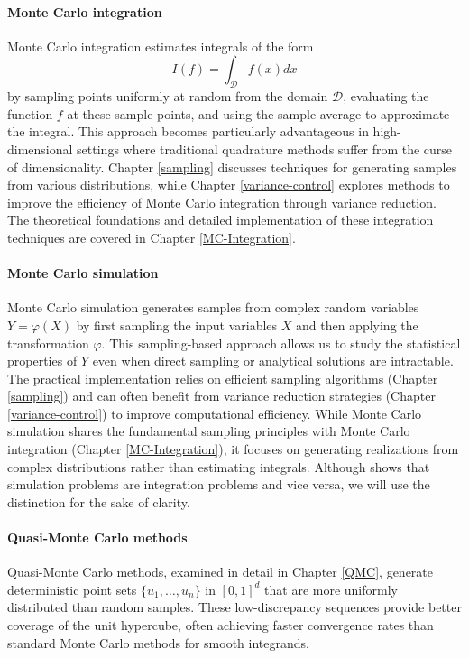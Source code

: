 \paragraph{Monte Carlo integration}
Monte Carlo integration estimates integrals of the form
$$
I(f) = \int_{\mathcal{D}}f(x)dx 
$$
by sampling points uniformly at random from the domain $\mathcal{D}$, evaluating the function $f$ at these sample points, and using the sample average to approximate the integral. This approach becomes particularly advantageous in high-dimensional settings where traditional quadrature methods suffer from the curse of dimensionality. Chapter \ref{sampling} discusses techniques for generating samples from various distributions, while Chapter \ref{variance-control} explores methods to improve the efficiency of Monte Carlo integration through variance reduction. The theoretical foundations and detailed implementation of these integration techniques are covered in Chapter \ref{MC-Integration}.

\paragraph{Monte Carlo simulation}
Monte Carlo simulation generates samples from complex random variables $Y = \varphi(X)$ by first sampling the input variables $X$ and then applying the transformation $\varphi$. This sampling-based approach allows us to study the statistical properties of $Y$ even when direct sampling or analytical solutions are intractable. The practical implementation relies on efficient sampling algorithms (Chapter \ref{sampling}) and can often benefit from variance reduction strategies (Chapter \ref{variance-control}) to improve computational efficiency. While Monte Carlo simulation shares the fundamental sampling principles with Monte Carlo integration (Chapter \ref{MC-Integration}), it focuses on generating realizations from complex distributions rather than estimating integrals. Although \cite{lemieux_monte_2009} shows that simulation problems are integration problems and vice versa, we will use the distinction for the sake of clarity.

\paragraph{Quasi-Monte Carlo methods}
Quasi-Monte Carlo methods, examined in detail in Chapter \ref{QMC}, generate deterministic point sets $\{u_1, \dots, u_n\}$ in $[0,1]^d$ that are more uniformly distributed than random samples. These low-discrepancy sequences provide better coverage of the unit hypercube, often achieving faster convergence rates than standard Monte Carlo methods for smooth integrands.

